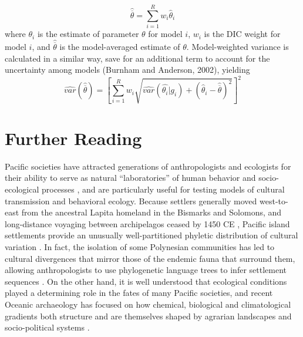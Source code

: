 \documentclass[11pt]{article}
\begin{document}
  \[\widehat{\overline{\theta}} = \sum_{i=1}^R w_i \widehat{\theta}_i
\]
where $\theta_i$ is the estimate of parameter $\theta$ for model $i$, $w_i$ is the DIC weight for model $i$, and $\widehat{\overline{\theta}}$ is the model-averaged estimate of $\theta$. Model-weighted variance is calculated in a similar way, save for an additional term to account for the uncertainty among models (Burnham and Anderson, 2002), yielding
  \[\widehat{var}(\widehat{\overline{\theta}}) = \left[\sum_{i=1}^R w_i \sqrt{\widehat{var}(\widehat{\theta_i}|g_i) + (\widehat{\theta}_i - \widehat{\overline{\theta}})^2}\right]^2
\]

%
%
\section{Further Reading}
Pacific societies have attracted generations of anthropologists and ecologists for their ability to serve as natural ``laboratories'' of human behavior and socio-ecological processes \citep{Mead1957:PolynesianLab}, and are particularly useful for testing models of cultural transmission and behavioral ecology. Because settlers generally moved west-to-east from the ancestral Lapita homeland in the Bismarks and Solomons, and long-distance voyaging between archipelagos ceased by 1450 CE \citep{Weisler2002:LongVoyagingCollapse}, Pacific island settlements provide an unusually well-partitioned phyletic distribution of cultural variation \citep{KirchGreen2001}. In fact, the isolation of some Polynesian communities has led to cultural divergences that mirror those of the endemic fauna that surround them, allowing anthropologists to use phylogenetic language trees to infer settlement sequences \citep{Gray2000tree, Gray2009:Phylogenies}. On the other hand, it is well understood that ecological conditions played a determining role in the fates of many Pacific societies, and recent Oceanic archaeology has focused on how chemical, biological and climatological gradients both structure and are themselves shaped by agrarian landscapes and socio-political systems \citep{Kirch1984evolution, Kirch2007}.
\end{document}
